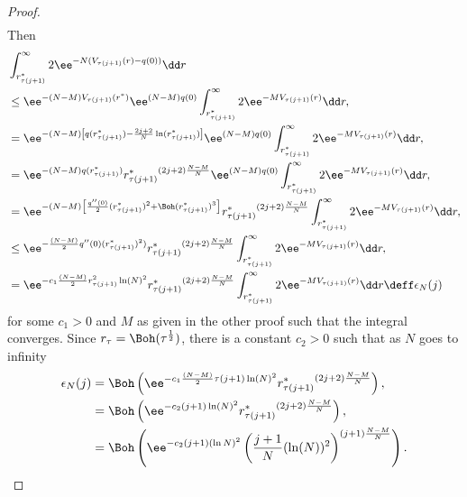 \begin{proof}
\begin{align}
\end{align}
Then
\begin{align}
	&  \int_{r^*_{\tau(j+1)}}^{\infty} 2 \ee^{-N (V_{\tau(j+1)}(r) - q(0))} \dd r \\
	& \leq  \ee^{ - (N - M) V_{\tau(j+1)}(r^*)} \ee^{(N-M) q(0)}\int_{r^*_{\tau(j+1)}}^{\infty} 2 \ee^{-M V_{\tau(j+1)}(r) } \dd r, \\
	& =  \ee^{ - (N - M) \left[ q(r^*_{\tau(j+1)}) - \frac{2j+2}{N} \ln(r^*_{\tau(j+1)}) \right]} \ee^{(N-M) q(0)} \int_{r^*_{\tau(j+1)}}^{\infty} 2 \ee^{-M V_{\tau(j+1)}(r) } \dd r, \\
	& = \ee^{- (N-M) q(r^*_{\tau(j+1)})} {r^*_{\tau(j+1)}}^{(2j+2) \frac{N-M}{N}} \ee^{(N-M) q(0)} \int_{r^*_{\tau(j+1)}}^{\infty} 2 \ee^{-M V_{\tau(j+1)}(r) } \dd r, \\
	& = \ee^{- (N-M) \left[\frac{q''(0)}{2}  (r^*_{\tau(j+1)})^2 + \Boh(r^*_{\tau(j+1)})^3\right] } {r^*_{\tau(j+1)}}^{(2j+2) \frac{N-M}{N}} \int_{r^*_{\tau(j+1)}}^{\infty} 2 \ee^{-M V_{\tau(j+1)}(r)} \dd r, \\
	& \leq \ee^{- \frac{(N-M)}{2} q''(0) (r^*_{\tau(j+1)})^2)} {r^*_{\tau(j+1)}}^{(2j+2)\frac{N-M}{N}} \int_{r^*_{\tau(j+1)}}^{\infty} 2 \ee^{-M V_{\tau(j+1)}(r)} \dd r, \\
	& = \ee^{- c_1 \frac{(N-M)}{2}r_{\tau(j+1)}^2 \ln(N)^2} {r^*_{\tau(j+1)}}^{(2j+2)\frac{N-M}{N}} \int_{r^*_{\tau(j+1)}}^{\infty} 2 \ee^{-M V_{\tau(j+1)}(r)} \dd r \deff \epsilon_N(j) \\
\end{align}
for some $c_1 > 0$ and $M$ as given in the other proof such that the integral converges.  Since $r_\tau = \Boh(\tau^{\frac{1}{2}})$, there is a constant $c_2 > 0$ such that as $N$ goes to infinity
\begin{align}
	\epsilon_N(j)  & = \Boh \left(\ee^{- c_1 \frac{(N-M)}{2} \tau(j+1) \ln(N)^2} {r^*_{\tau(j+1)}}^{(2j+2)\frac{N-M}{N}}\right), \\
	&= \Boh \left(\ee^{- c_2 (j+1) \ln(N)^2} {r^*_{\tau(j+1)}}^{(2j+2)\frac{N-M}{N}}\right), \\
	& = \Boh\left(\ee^{-c_2 (j + 1) (\ln N)^2}  \left(\frac{j+1}{N} (\ln(N))^2 \right)^{(j+1) \frac{N-M}{N}} \right).
\end{align}


\end{proof}
